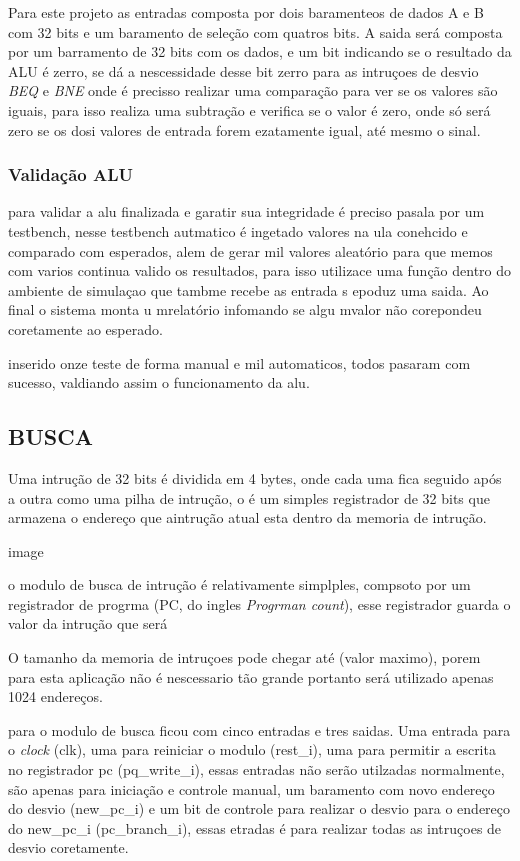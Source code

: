 Para este projeto as entradas composta por dois baramenteos de dados  A e B com 32 bits e um baramento de seleção com quatros bits. A saida será composta por um barramento de 32 bits com os dados, e um bit indicando se o resultado da ALU é zerro, se dá a nescessidade desse bit zerro para as intruçoes de desvio \textit{BEQ} e \textit{BNE} onde é precisso realizar uma comparação para ver se os valores são iguais, para isso realiza uma subtração e verifica se o valor é zero, onde só será zero se os dosi valores de entrada forem ezatamente igual, até mesmo o sinal. 

\subsubsection{Validação ALU}
\label{subSub:tb_alu}

para validar a alu finalizada e garatir sua integridade é preciso pasala por um testbench, nesse testbench autmatico é ingetado valores na ula conehcido e comparado com esperados, alem de gerar mil valores aleatório para que memos com varios continua valido os resultados, para isso utilizace uma função dentro do ambiente de simulaçao que tambme recebe as entrada s epoduz uma saida. Ao final o sistema monta u mrelatório infomando se algu mvalor não corepondeu coretamente ao esperado.

inserido onze teste de forma manual  e mil automaticos, todos pasaram com sucesso, valdiando assim o funcionamento da alu.



\subsection{BUSCA}
\label{sub:busca}

Uma intrução de 32 bits é dividida em 4 bytes, onde cada uma fica seguido após a outra como uma pilha de intrução, o é um simples registrador de 32 bits que armazena o endereço que aintrução atual esta dentro da memoria de intrução.

image

o modulo de busca de intrução é relativamente simplples, compsoto por um registrador de progrma (PC, do ingles \textit{Progrman count}), esse registrador guarda o valor da intrução que será 

O tamanho da memoria de intruçoes pode chegar até (valor maximo), porem para esta aplicação não é nescessario tão grande portanto será utilizado apenas 1024 endereços.

para o modulo de busca ficou com cinco entradas e tres saidas. Uma entrada para   o \textit{clock} (clk), uma para reiniciar o modulo (rest_i), uma para permitir a escrita no registrador pc (pq_write_i), essas entradas não serão utilzadas normalmente, são apenas para iniciação e controle manual, um baramento com novo endereço do desvio (new_pc_i) e um bit de controle para realizar o desvio para o endereço do new_pc_i (pc_branch_i), essas etradas é para realizar todas as intruçoes de desvio coretamente.

